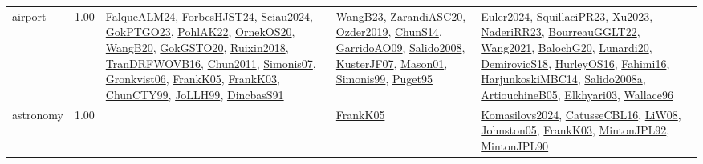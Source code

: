 {\begin{longtable}{p{3cm}r>{\raggedright\arraybackslash}p{6cm}>{\raggedright\arraybackslash}p{6cm}>{\raggedright\arraybackslash}p{8cm}}
\index{airport}\index{ApplicationAreas!airport}airport &  1.00 & \hyperref[detail:FalqueALM24]{FalqueALM24}, \hyperref[detail:ForbesHJST24]{ForbesHJST24}, \hyperref[detail:Sciau2024]{Sciau2024}, \hyperref[detail:GokPTGO23]{GokPTGO23}, \hyperref[detail:PohlAK22]{PohlAK22}, \hyperref[detail:OrnekOS20]{OrnekOS20}, \hyperref[detail:WangB20]{WangB20}, \hyperref[detail:GokGSTO20]{GokGSTO20}, \hyperref[detail:Ruixin2018]{Ruixin2018}, \hyperref[detail:TranDRFWOVB16]{TranDRFWOVB16}, \hyperref[detail:Chun2011]{Chun2011}, \hyperref[detail:Simonis07]{Simonis07}, \hyperref[detail:Gronkvist06]{Gronkvist06}, \hyperref[detail:FrankK05]{FrankK05}, \hyperref[detail:FrankK03]{FrankK03}, \hyperref[detail:ChunCTY99]{ChunCTY99}, \hyperref[detail:JoLLH99]{JoLLH99}, \hyperref[detail:DincbasS91]{DincbasS91} & \hyperref[detail:WangB23]{WangB23}, \hyperref[detail:ZarandiASC20]{ZarandiASC20}, \hyperref[detail:Ozder2019]{Ozder2019}, \hyperref[detail:ChunS14]{ChunS14}, \hyperref[detail:GarridoAO09]{GarridoAO09}, \hyperref[detail:Salido2008]{Salido2008}, \hyperref[detail:KusterJF07]{KusterJF07}, \hyperref[detail:Mason01]{Mason01}, \hyperref[detail:Simonis99]{Simonis99}, \hyperref[detail:Puget95]{Puget95} & \hyperref[detail:Euler2024]{Euler2024}, \hyperref[detail:SquillaciPR23]{SquillaciPR23}, \hyperref[detail:Xu2023]{Xu2023}, \hyperref[detail:NaderiRR23]{NaderiRR23}, \hyperref[detail:BourreauGGLT22]{BourreauGGLT22}, \hyperref[detail:Wang2021]{Wang2021}, \hyperref[detail:BalochG20]{BalochG20}, \hyperref[detail:Lunardi20]{Lunardi20}, \hyperref[detail:DemirovicS18]{DemirovicS18}, \hyperref[detail:HurleyOS16]{HurleyOS16}, \hyperref[detail:Fahimi16]{Fahimi16}, \hyperref[detail:HarjunkoskiMBC14]{HarjunkoskiMBC14}, \hyperref[detail:Salido2008a]{Salido2008a}, \hyperref[detail:ArtiouchineB05]{ArtiouchineB05}, \hyperref[detail:Elkhyari03]{Elkhyari03}, \hyperref[detail:Wallace96]{Wallace96}\\
\index{astronomy}\index{ApplicationAreas!astronomy}astronomy &  1.00 &  & \hyperref[detail:FrankK05]{FrankK05} & \hyperref[detail:Komasilovs2024]{Komasilovs2024}, \hyperref[detail:CatusseCBL16]{CatusseCBL16}, \hyperref[detail:LiW08]{LiW08}, \hyperref[detail:Johnston05]{Johnston05}, \hyperref[detail:FrankK03]{FrankK03}, \hyperref[detail:MintonJPL92]{MintonJPL92}, \hyperref[detail:MintonJPL90]{MintonJPL90}\\

\end{longtable}}
